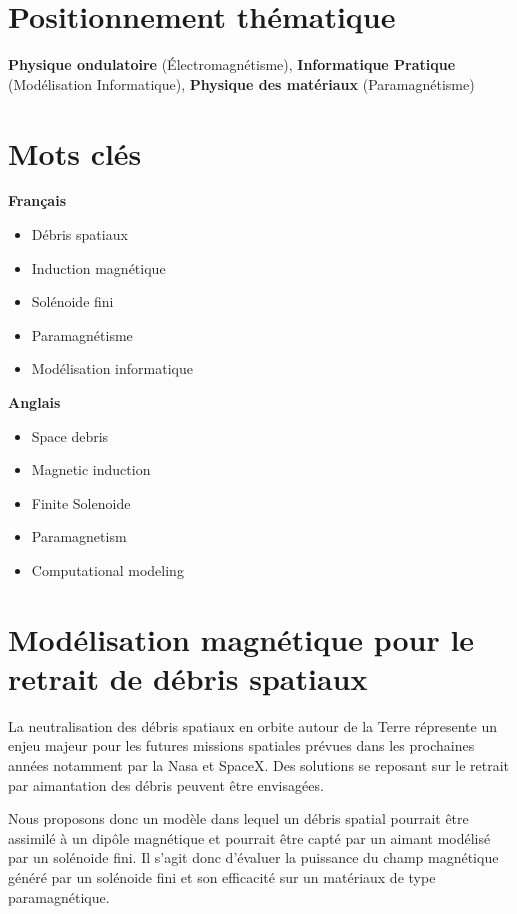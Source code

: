 \documentclass[a4paper,1pt]{article}
\begin{document}
\section{Positionnement thématique}
\textbf{Physique ondulatoire} (Électromagnétisme), \textbf{Informatique Pratique} (Modélisation Informatique), \textbf{Physique des matériaux }(Paramagnétisme)

\section{Mots clés}
\begin{multicols}{2}
\textbf{Français}
\begin{itemize}
	\item Débris spatiaux
	\item Induction magnétique
	\item Solénoide fini
	\item Paramagnétisme
	\item Modélisation informatique
\end{itemize}
\columnbreak

\textbf{Anglais}
\begin{itemize}
	\item Space debris
	\item Magnetic induction
	\item Finite Solenoide
	\item Paramagnetism
	\item Computational modeling
\end{itemize}
\end{multicols}


\section{Modélisation magnétique pour le retrait de débris spatiaux}

La neutralisation des débris spatiaux en orbite autour de la Terre répresente un enjeu majeur pour les futures missions spatiales prévues dans les prochaines années notamment par la Nasa et SpaceX. Des solutions se reposant sur le retrait par aimantation des débris peuvent être envisagées.

Nous proposons donc un modèle dans lequel un débris spatial pourrait être assimilé à un dipôle magnétique et pourrait être capté par un aimant modélisé par un solénoide fini. Il s'agit donc d'évaluer la puissance du champ magnétique généré par un solénoide fini et son efficacité sur un matériaux de type paramagnétique. 
\end{document}
